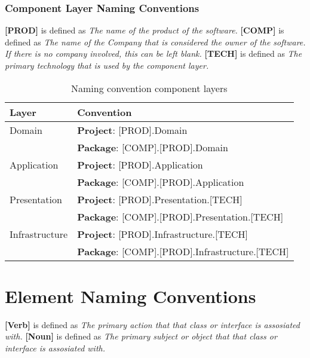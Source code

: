 \subsubsection{Component Layer Naming Conventions} \label{appendix_component_naming_convention}

\textbf{[PROD]} is defined as \textit{The name of the product of the software.} \newline 
\textbf{[COMP]} is defined as \textit{The name of the Company that is considered the owner of the software. If
there is no company involved, this can be left blank.} \newline 
\textbf{[TECH]} is defined as \textit{The primary technology that is used by the component layer.} 

\begin{table}[H]
    \footnotesize
    \caption{Naming convention component layers}
    \begin{tabular}{ l l }
    \hline
    \textbf{Layer} & \textbf{Convention} \\ 
    \hline
    Domain & \textbf{Project}: [PROD].Domain \\ & \textbf{Package}: [COMP].[PROD].Domain \\
    Application & \textbf{Project}: [PROD].Application \\ & \textbf{Package}: [COMP].[PROD].Application \\
    Presentation & \textbf{Project}: [PROD].Presentation.[TECH] \\ & \textbf{Package}: [COMP].[PROD].Presentation.[TECH] \\
    Infrastructure & \textbf{Project}: [PROD].Infrastructure.[TECH] \\ & \textbf{Package}: [COMP].[PROD].Infrastructure.[TECH]
    \\ \hline
    \end{tabular}

\label{table:component_naming_convention}
\end{table}

\section{Element Naming Conventions} \label{appendix_element_naming_convention}

\textbf{[Verb]} is defined as \textit{The primary action that that class or interface is assosiated with.} \newline 
\textbf{[Noun]} is defined as \textit{The primary subject or object that that class or interface is assosiated with.} 

